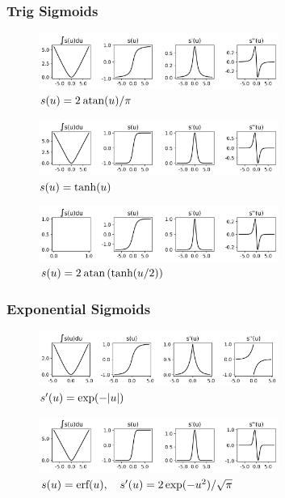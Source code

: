 \documentclass{article}
\begin{document}
\subsubsection{Trig Sigmoids}
    \begin{figure}[h!]
        \centering
        \includegraphics[width=0.7\textwidth]{./figs/nn/sig/atan.png}
        \caption{$s(u)=2\:\text{atan}(u)/\pi$}
        \label{fig:sig_atan}
    \end{figure}
    \begin{figure}[h!]
        \centering
        \includegraphics[width=0.7\textwidth]{./figs/nn/sig/tanh.png}
        \caption{$s(u)=\text{tanh}(u)$}
        \label{fig:sig_tanh}
    \end{figure}
    \begin{figure}[h!]
        \centering
        \includegraphics[width=0.7\textwidth]{./figs/nn/sig/gd.png}
        \caption{$s(u)=2\:\text{atan}\left(\text{tanh}(u/2)\right)$}
        \label{fig:sig_gd}
    \end{figure}
\subsubsection{Exponential Sigmoids}
    \begin{figure}[h!]
        \centering
        \includegraphics[width=0.7\textwidth]{./figs/nn/sig/exp.png}
        \caption{$s'(u)=\exp(-|u|)$}
        \label{fig:sig_exp}
    \end{figure} 
    \begin{figure}[h!]
        \centering
        \includegraphics[width=0.7\textwidth]{./figs/nn/sig/Gauss.png}
        \caption{$s(u)=\text{erf}(u),\quad s'(u)=2\exp(-u^2)/\sqrt{\pi}$}
        \label{fig:sig_Gauss}
    \end{figure}
\end{document}
